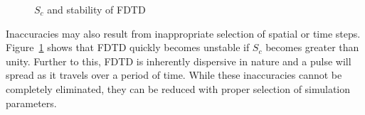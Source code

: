 \documentclass[10pt,A4paper]{report}
\begin{document}
\begin{figure}[H]
\centering
\mbox{\quad{}}
\caption{$S_c$ and stability of FDTD}
\label{Unstable-FDTD}
\end{figure}
Inaccuracies may also result from inappropriate selection of spatial or time steps. Figure~\ref{Unstable-FDTD} shows that FDTD quickly becomes unstable if $S_c$ becomes greater than unity. Further to this, FDTD is inherently dispersive in nature and a pulse will spread as it travels over a period of time. While these inaccuracies cannot be completely eliminated, they can be reduced with proper selection of simulation parameters.
\end{document}
